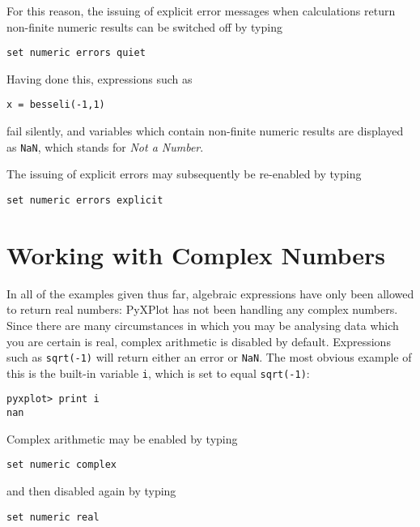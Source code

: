 For this reason, the issuing of explicit error messages when calculations
return non-finite numeric results can be switched off by typing

\begin{verbatim}
set numeric errors quiet
\end{verbatim}

\noindent Having done this, expressions such as

\begin{verbatim}
x = besseli(-1,1)
\end{verbatim}

\noindent fail silently, and variables which contain non-finite numeric results
are displayed as {\tt NaN}, which stands for {\it Not a
Number}.

The issuing of explicit errors may subsequently be re-enabled by typing

\begin{verbatim}
set numeric errors explicit
\end{verbatim}

\section{Working with Complex Numbers}
\label{sec:complex_numbers}

In all of the examples given thus far, algebraic expressions have only been
allowed to return real numbers: PyXPlot has not been handling any complex
numbers. Since there are many circumstances in which you may be analysing data
which you are certain is real, complex arithmetic is disabled by default.
Expressions such as {\tt sqrt(-1)} will return either an error or {\tt NaN}.
The most obvious example of this is the built-in variable {\tt i}, which is set
to equal {\tt sqrt(-1)}:

\begin{verbatim}
pyxplot> print i
nan
\end{verbatim}

Complex arithmetic may be enabled by typing

\begin{verbatim}
set numeric complex
\end{verbatim}

\noindent and then disabled again by typing

\begin{verbatim}
set numeric real
\end{verbatim}

